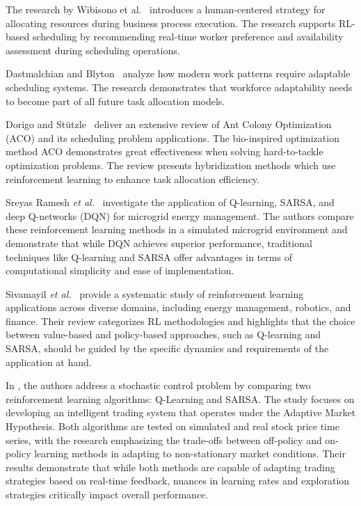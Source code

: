 \documentclass[%
aip,
cp,  %
amsmath,amssymb,
reprint,%
]{revtex4-2}
\begin{document}
	The research by Wibisono et al.~\cite{wibisono2016} introduces a human-centered
	strategy for allocating resources during business process execution. The research
	supports RL-based scheduling by recommending real-time worker preference and availability
	assessment during scheduling operations.
	
	Dastmalchian and Blyton~\cite{dastmalchian2001} analyze how modern work patterns
	require adaptable scheduling systems. The research demonstrates that workforce
	adaptability needs to become part of all future task allocation models.
	
	Dorigo and Stützle~\cite{dorigo2016} deliver an extensive review of Ant Colony
	Optimization (ACO) and its scheduling problem applications. The bio-inspired optimization
	method ACO demonstrates great effectiveness when solving hard-to-tackle optimization
	problems. The review presents hybridization methods which use reinforcement
	learning to enhance task allocation efficiency.
	
	Sreyas Ramesh \textit{et al.}~\cite{turn0file0} investigate the application of Q-learning, SARSA, and deep Q-networks (DQN) for microgrid energy management. The authors compare these reinforcement learning methods in a simulated microgrid environment and demonstrate that while DQN achieves superior performance, traditional techniques like Q-learning and SARSA offer advantages in terms of computational simplicity and ease of implementation.
	
	Sivamayil \textit{et al.}~\cite{turn0file1} provide a systematic study of reinforcement learning applications across diverse domains, including energy management, robotics, and finance. Their review categorizes RL methodologies and highlights that the choice between value-based and policy-based approaches, such as Q-learning and SARSA, should be guided by the specific dynamics and requirements of the application at hand.
	
	In \cite{Corazza2015}, the authors address a stochastic control problem by comparing two reinforcement learning algorithms: Q-Learning and SARSA. The study focuses on developing an intelligent trading system that operates under the Adaptive Market Hypothesis. Both algorithms are tested on simulated and real stock price time series, with the research emphasizing the trade-offs between off-policy and on-policy learning methods in adapting to non-stationary market conditions. Their results demonstrate that while both methods are capable of adapting trading strategies based on real-time feedback, nuances in learning rates and exploration strategies critically impact overall performance.
	
\end{document}
